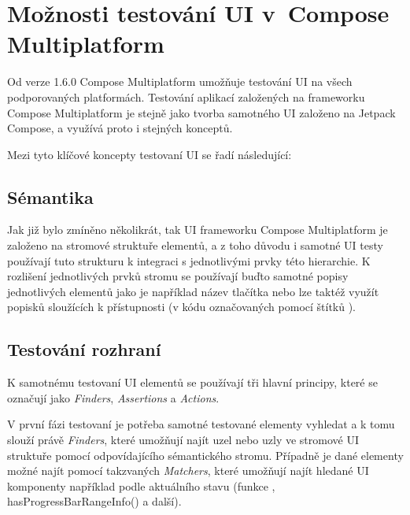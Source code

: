 

\section{Možnosti testování UI v~Compose Multiplatform}
Od verze 1.6.0 Compose Multiplatform umožňuje testování UI na všech podporovaných platformách. \cite{composeNews1.6.0}
Testování aplikací založených na frameworku Compose Multiplatform je stejně jako tvorba samotného UI založeno na Jetpack Compose, a využívá 
proto i stejných konceptů. 

\medskip

Mezi tyto klíčové koncepty testovaní UI se řadí následující:


\subsection*{Sémantika}
Jak již bylo zmíněno několikrát, tak UI frameworku Compose Multiplatform je založeno na stromové struktuře elementů, a z toho důvodu 
i samotné UI testy používají tuto strukturu k integraci s jednotlivými prvky této hierarchie. K rozlišení jednotlivých prvků 
stromu se používají buďto samotné popisy jednotlivých elementů jako je například název tlačítka nebo lze taktéž využít popisků
sloužících k přístupnosti (v kódu označovaných pomocí štítků ).


\subsection*{Testování rozhraní}
K samotnému testovaní UI elementů se používají tři hlavní principy, které se
označují jako \textit{Finders}, \textit{Assertions} a \textit{Actions}.

V první fázi testovaní je potřeba samotné testované elementy vyhledat a k tomu slouží právě \textit{Finders}, které  umožňují najít
 uzel nebo uzly ve stromové UI struktuře pomocí odpovídajícího sémantického stromu. Případně je dané elementy možné najít
pomocí takzvaných \textit{Matchers}, které umožňují najít hledané UI komponenty například podle aktuálního stavu 
(funkce , hasProgressBarRangeInfo() a další).

